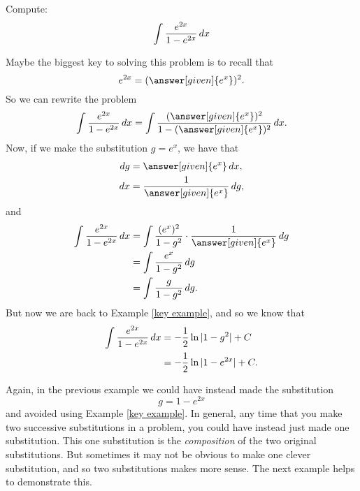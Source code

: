 \documentclass{ximera}
\begin{document}
\begin{example}
Compute:
\[
\int \frac{e^{2x}}{1 - e^{2x}} \mathop{}\!d x
\]
\begin{explanation}
Maybe the biggest key to solving this problem is to recall that
\[
e^{2x} = (\answer[given]{e^x})^2.
\]
So we can rewrite the problem
\[
\int \frac{e^{2x}}{1 - e^{2x}} \d x = \int \frac{(\answer[given]{e^x})^2}{1 - (\answer[given]{e^x})^2} \d x.
\]
Now, if we make the substitution $g = e^x$, we have that
\begin{align*}
\d g &= \answer[given]{e^x} \d x,\\
\d x &= \frac{1}{\answer[given]{e^x}} \d g,
\end{align*}
and
\begin{align*}
\int \frac{e^{2x}}{1 - e^{2x}} \d x &= \int \frac{(e^x)^2}{1 - g^2} \cdot \frac{1}{\answer[given]{e^x}} \d g  \\
&= \int \frac{e^x}{1-g^2} \d g  \\
&= \int \frac{g}{1-g^2} \d g.
\end{align*}
But now we are back to Example \ref{key example}, and so we know that
\begin{align*}
\int \frac{e^{2x}}{1 - e^{2x}} \mathop{}\!d x &= - \frac{1}{2} \ln|1-g^2| + C  \\
&= - \frac{1}{2} \ln|1 - e^{2x}| + C.
\end{align*}
\end{explanation}
\end{example}


Again, in the previous example we could have instead made the substitution 
\[
g = 1 - e^{2x}
\]
and avoided using Example \ref{key example}.  
In general, any time that you make two successive substitutions in a problem, you could have instead just made one substitution.  
This one substitution is the \textit{composition} of the two original substitutions.  
But sometimes it may not be obvious to make one clever substitution, and so two substitutions makes more sense.  
The next example helps to demonstrate this.
\end{document}
